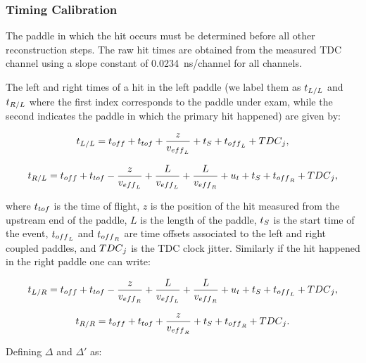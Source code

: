 \documentclass{elsart}
\begin{document}
\subsubsection{Timing Calibration}

The paddle in which the hit occurs must be determined before all other reconstruction steps. The raw hit
times are obtained from the measured TDC channel using a slope constant of 0.0234~ns/channel for all
channels.

The left and right times of a hit in the left paddle (we label them as $t_{{\rm{L}}/{\rm{L}}}$ and
$t_{\rm{R}/{\rm{L}}}$ where the first index corresponds to the paddle under exam, while the second indicates
the paddle in which the primary hit happened) are given by:

\begin{equation}
\label{eq_time_hit_lr}
t_{{\rm{L}}/{\rm{L}}}=t_{\rm{off}}+t_{\rm{tof}}+\frac{z}{v_{\rm{eff}_L}}+t_{\rm{S}}+t_{\rm{off}_{\rm{L}}}+{\rm{TDC}}_{\rm{j}},
\end{equation}

\begin{equation}
\label{eq_time_hit_lr1}
t_{{\rm{R}/{\rm{L}}}}=t_{\rm{off}}+t_{\rm{tof}}-\frac{z}{v_{\rm{eff}_L}}+\frac{L}{v_{\rm{eff}_L}}
+\frac{L}{v_{\rm{eff}_{\rm{R}}}}+u_{\rm{t}}+t_{\rm{S}}+t_{\rm{off}_{\rm{R}}}+{\rm{TDC}}_{\rm{j}},
\end{equation}

\noindent
where $t_{\rm{tof}}$ is the time of flight, $z$ is the position of the hit measured from the upstream end of the
paddle, $L$ is the length of the paddle, $t_{\rm{S}}$ is the start time of the event, $t_{\rm{off}_{\rm{L}}}$ and
$t_{\rm{off}_{\rm{R}}}$ are time offsets associated to the left and right coupled paddles, and ${\rm{TDC}}_{\rm{j}}$
is the TDC clock jitter. Similarly if the hit happened in the right paddle one can write:

\begin{equation}
  t_{{\rm{L}}/{\rm{R}}}=t_{\rm{off}}+t_{\rm{tof}}-\frac{z}{v_{\rm{eff}_{\rm{R}}}}+\frac{L}{v_{\rm{eff}_L}}
  +\frac{L}{v_{\rm{eff}_{\rm{R}}}}+u_{\rm{t}}+t_{\rm{S}}+t_{\rm{off}_{\rm{L}}}+{\rm{TDC}}_{\rm{j}},
\end{equation}

\begin{equation}
t_{R/R}=t_{\rm{off}}+t_{\rm{tof}}+\frac{z}{v_{\rm{eff}_{\rm{R}}}}+t_{\rm{S}}+t_{\rm{off}_{\rm{R}}}+{\rm{TDC}}_{\rm{j}}.
\end{equation}

Defining $\Delta$ and $\Delta'$ as:
\end{document}
